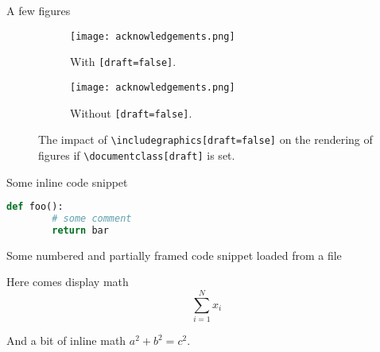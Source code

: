 A few figures
\begin{figure}[htb!]
    \center
    \begin{subfigure}{.4\textwidth}
        \center
        \texttt{[image: acknowledgements.png]}
        \caption{With \texttt{[draft=false]}.}
    \end{subfigure}
    \begin{subfigure}{.4\textwidth}
        \center
        \texttt{[image: acknowledgements.png]}
        \caption{Without \texttt{[draft=false]}.}
    \end{subfigure}
    \cprotect\caption[Subfigure showcase]{
        The impact of \verb$\includegraphics[draft=false]$ on the rendering of
        figures if \verb$\documentclass[draft]$ is set.
    }
\end{figure}


Some inline code snippet
\begin{lstlisting}[language=Python]
    def foo():
        # some comment
        return bar
\end{lstlisting}

Some numbered and partially framed code snippet loaded from a file


Here comes display math
\[
    \sum_{i=1}^N{x_i}
\]

And a bit of inline math \(a^2 + b^2 = c^2\).
